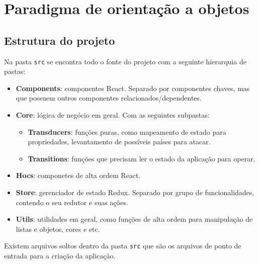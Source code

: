 \documentclass[rel_mlp]{iiufrgs}
\begin{document}
\section{Paradigma de orientação a objetos}

\subsection{Estrutura do projeto}
Na pasta \verb|src| se encontra todo o fonte do projeto com a seguinte hierarquia de pastas:
\begin{itemize}
  \item \textbf{Components}: componentes React. Separado por componentes chaves, mas que possuem outros componentes relacionados/dependentes.
  \item \textbf{Core}: lógica de negócio em geral. Com as seguintes subpastas:
    \begin{itemize}
      \item \textbf{Transducers}: funções puras, como mapeamento de estado para propriedades, levantamento de possíveis países para atacar.
      \item \textbf{Transitions}: funções que precisam ler o estado da aplicação para operar.
    \end{itemize}
  \item \textbf{Hocs}: componetes de alta ordem React.
  \item \textbf{Store}: gerenciador de estado Redux. Separado por grupo de funcionalidades, contendo o seu redutor e suas ações.
  \item \textbf{Utils}: utilidades em geral, como funções de alta ordem para manipulação de listas e objetos, cores e etc.
\end{itemize}

\par Existem arquivos soltos dentro da pasta \verb|src| que são os arquivos de ponto de entrada para a criação da aplicação.
\end{document}
